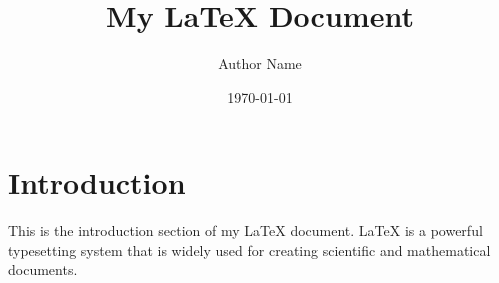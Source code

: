 \documentclass{article}
\title{My LaTeX Document}
\author{Author Name}
\date{\today}
\begin{document}
\maketitle

\section{Introduction}
This is the introduction section of my LaTeX document. LaTeX is a powerful typesetting system that is widely used for creating scientific and mathematical documents.
\end{document}
